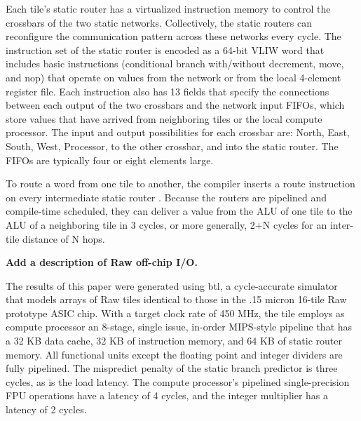 Each tile's static router has a virtualized instruction memory to
control the crossbars of the two static networks. Collectively, the
static routers can reconfigure the communication pattern across these
networks every cycle.  The instruction set of the static router is
encoded as a 64-bit VLIW word that includes basic instructions
(conditional branch with/without decrement, move, and nop) that
operate on values from the network or from the local 4-element
register file. Each instruction also has 13 fields that specify the
connections between each output of the two crossbars and the network
input FIFOs, which store values that have arrived from neighboring
tiles or the local compute processor.  The input and output
possibilities for each crossbar are: North, East, South, West,
Processor, to the other crossbar, and into the static router. The
FIFOs are typically four or eight elements large.

To route a word from one tile to another, the compiler inserts a route
instruction on every intermediate static router \cite{lee98spacetime}.
Because the routers are pipelined and compile-time scheduled, they can
deliver a value from the ALU of one tile to the ALU of a neighboring
tile in 3 cycles, or more generally, 2+N cycles for an inter-tile
distance of N hops.

{\bf Add a description of Raw off-chip I/O.}

The results of this paper were generated using btl, a cycle-accurate
simulator that models arrays of Raw tiles identical to those in the
.15 micron 16-tile Raw prototype ASIC chip.  With a target clock rate
of 450 MHz, the tile employs as compute processor an 8-stage, single
issue, in-order MIPS-style pipeline that has a 32 KB data cache, 32 KB
of instruction memory, and 64 KB of static router memory. All
functional units except the floating point and integer dividers are
fully pipelined. The mispredict penalty of the static branch predictor
is three cycles, as is the load latency. The compute processor's
pipelined single-precision FPU operations have a latency of 4 cycles,
and the integer multiplier has a latency of 2 cycles.

